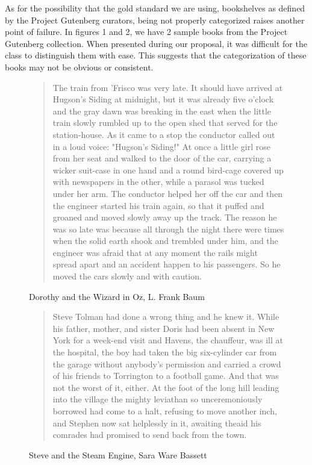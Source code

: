 \documentclass[]{article}
\begin{document}
As for the possibility that the gold standard we are using, bookshelves as defined by the Project Gutenberg curators, being not properly categorized raises another point of failure.
In figures 1 and 2, we have 2 sample books from the Project Gutenberg collection.
When presented during our proposal, it was difficult for the class to distinguish them with ease.
This suggests that the categorization of these books may not be obvious or consistent.

\begin{figure}
	\begin{quotation}
		The train from 'Frisco was very late.  It should have arrived at Hugson's Siding at midnight, but it was already five o'clock and the gray dawn was breaking in the east when the little train slowly rumbled up to the open shed that served for the station-house.  As it came to a stop the conductor called out in a loud voice:
		"Hugson's Siding!"
		At once a little girl rose from her seat and walked to the door of the
		car, carrying a wicker suit-case in one hand and a round bird-cage
		covered up with newspapers in the other, while a parasol was tucked under her arm.  The conductor helped her off the car and then the engineer started his train again, so that it puffed and groaned and moved slowly away up the track.  The reason he was so late was because all through the night there were times when the solid earth shook and trembled under him, and the engineer was afraid that at any moment the rails might spread apart and an accident happen to his passengers.  So he moved the cars slowly and with caution.
	\end{quotation}
	\label{figure:book1}
	\caption{Dorothy and the Wizard in Oz, L. Frank Baum}
\end{figure}

\begin{figure}
	\begin{quotation}
		Steve Tolman had done a wrong thing and he knew it.
		While his father, mother, and sister Doris had been absent in New York for a week-end visit and Havens, the chauffeur, was ill at the hospital, the boy had taken the big six-cylinder car from the garage without anybody's permission and carried a crowd of his friends to Torrington to a football game. And that was not the worst of it, either. At the foot of the long hill leading into the village the mighty leviathan so unceremoniously borrowed had come to a halt, refusing to move another inch, and Stephen now sat helplessly in it, awaiting theaid his comrades had promised to send back from the town.
	\end{quotation}
	\label{figure:book2}
	\caption{Steve and the Steam Engine, Sara Ware Bassett}
\end{figure}

\printbibliography
\end{document}
